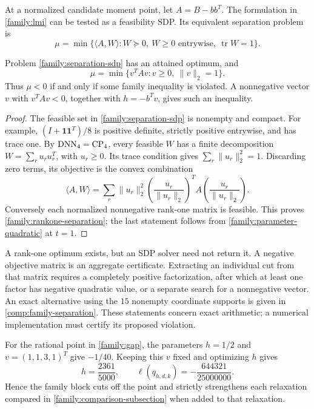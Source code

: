 At a normalized candidate moment point, let $A=B-bb^T$. The formulation
in \cref{family:lmi} can be tested as a feasibility SDP. Its equivalent
separation problem is
\begin{equation}
\label{family:separation-sdp}
\mu=\min\{\langle A,W\rangle: W\succeq0,\ W\ge0
             \text{ entrywise},\ \operatorname{tr}W=1\}.
\end{equation}

\begin{proposition}
\label{family:separation}
Problem \eqref{family:separation-sdp} has an attained optimum, and
\begin{equation}
\label{family:rankone-separation}
\mu=\min\{v^TAv:v\ge0,\ \|v\|_2=1\}.
\end{equation}
Thus $\mu<0$ if and only if some family inequality is violated.
A nonnegative vector $v$ with $v^TAv<0$, together with $h=-b^Tv$,
gives such an inequality.
\end{proposition}

\begin{proof}
The feasible set in \eqref{family:separation-sdp} is nonempty and compact.
For example, $(I+\mathbf1\mathbf1^T)/8$ is positive definite, strictly
positive entrywise, and has trace one. By $\operatorname{DNN}_4=\operatorname{CP}_4$, every feasible
$W$ has a finite decomposition $W=\sum_r u_ru_r^T$, with $u_r\ge0$.
Its trace condition gives $\sum_r\|u_r\|_2^2=1$. Discarding zero terms,
its objective is the convex combination
\[
\langle A,W\rangle
=\sum_r\|u_r\|_2^2
 \left(\frac{u_r}{\|u_r\|_2}\right)^T
 A\left(\frac{u_r}{\|u_r\|_2}\right).
\]
Conversely each normalized nonnegative rank-one matrix is feasible.
This proves \eqref{family:rankone-separation}; the last statement follows
from \eqref{family:parameter-quadratic} at $t=1$.
\end{proof}

A rank-one optimum exists, but an SDP solver need not return it.
A negative objective matrix is an aggregate certificate. Extracting
an individual cut from that matrix requires a completely positive
factorization, after which at least one factor has negative quadratic
value, or a separate search for a nonnegative vector. An exact
alternative using the $15$ nonempty coordinate supports is given in
\cref{comp:family-separation}. These statements concern exact arithmetic;
a numerical implementation must certify its proposed violation.

For the rational point in \cref{family:gap}, the parameters
$h=1/2$ and $v=(1,1,3,1)^T$ give $-1/40$. Keeping this $v$ fixed and
optimizing $h$ gives
\[
h=\frac{2361}{5000},\qquad
\ell(q_{h,d,k})=-\frac{644321}{25000000}.
\]
Hence the family block cuts off the point and strictly strengthens
each relaxation compared in \cref{family:comparison-subsection} when
added to that relaxation.

